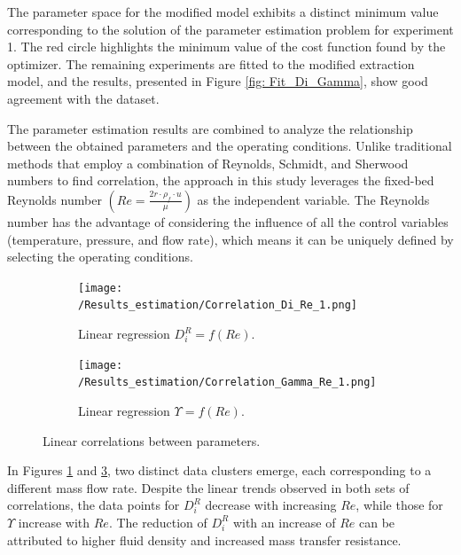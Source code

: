 \documentclass[a4paper,fleqn]{cas-dc}
\begin{document}
				The parameter space for the modified model exhibits a distinct minimum value corresponding to the solution of the parameter estimation problem for experiment 1. The red circle highlights the minimum value of the cost function found by the optimizer. The remaining experiments are fitted to the modified extraction model, and the results, presented in Figure \ref{fig: Fit_Di_Gamma}, show good agreement with the dataset. 
				
				The parameter estimation results are combined to analyze the relationship between the obtained parameters and the operating conditions. Unlike traditional methods that employ a combination of Reynolds, Schmidt, and Sherwood numbers to find correlation, the approach in this study leverages the fixed-bed Reynolds number $\left(Re = \frac{2r \cdot \rho_f \cdot u}{\mu}\right)$ as the independent variable. The Reynolds number has the advantage of considering the influence of all the control variables (temperature, pressure, and flow rate), which means it can be uniquely defined by selecting the operating conditions.	
				
				\begin{figure}[!h]
					\centering
					\begin{subfigure}{0.9\columnwidth}
						\centering
						\texttt{[image: /Results\_estimation/Correlation\_Di\_Re\_1.png]}
						\caption{Linear regression $D_i^R = f(Re)$.}
						\label{fig: Correlations_Di_Re}
					\end{subfigure}
					\hfill
					\begin{subfigure}{0.9\columnwidth}
						\centering
						\texttt{[image: /Results\_estimation/Correlation\_Gamma\_Re\_1.png]}
						\caption{Linear regression $\Upsilon = f(Re)$.}
						\label{fig: Correlations_Gamma_Re}
					\end{subfigure}
					\caption{Linear correlations between parameters.}
				\end{figure}
				
				In Figures \ref{fig: Correlations_Di_Re} and \ref{fig: Correlations_Gamma_Re}, two distinct data clusters emerge, each corresponding to a different mass flow rate. Despite the linear trends observed in both sets of correlations, the data points for $D_i^R$ decrease with increasing $Re$, while those for $\Upsilon$ increase with $Re$. The reduction of $D_i^R$ with an increase of $Re$ can be attributed to higher fluid density and increased mass transfer resistance.
				
\end{document}
